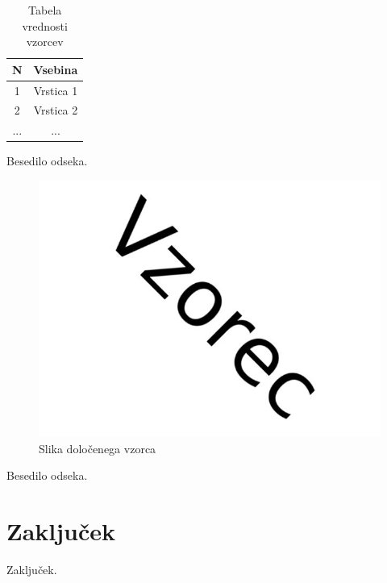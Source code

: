 \documentclass[a4paper,12pt]{report}
\begin{document}
\begin{table}[htb]
 \centering
 \begin{tabular}{c || c}
  \textbf{N} & Vsebina\\ \hline\hline
  1 & Vrstica 1\\        \hline
  2 & Vrstica 2\\        \hline
  ... & ... \\
\end{tabular}
\caption{Tabela vrednosti vzorcev}
\label{tab:1}
\end{table}

Besedilo odseka.

\begin{figure}[htb]
	\centering
	\includegraphics[width=13cm]{img/vzorec.jpg}
	\caption{Slika določenega vzorca}
\label{fig:1}
\end{figure}

Besedilo odseka.

\chapter{Zaključek}

Zaključek.
\end{document}
